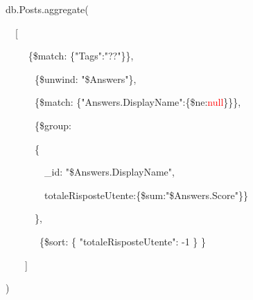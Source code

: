 \textcolor{mydark}{db.Posts.aggregate(}
    \par
    ~~\textcolor{mydark}{[}\par
    ~~~~ \textcolor{mydark}{\{}\textcolor{mybrown}{\$match}: \textcolor{mydark}{\{}\textcolor{mygreen}{"Tags":"??"}\textcolor{mydark}{\}}\textcolor{mydark}{\}},\par
    ~~~~~~\textcolor{mydark}{\{}\textcolor{mybrown}{\$unwind}: \textcolor{mygreen}{"\$Answers"}\textcolor{mydark}{\}},\par
    ~~~~~~\textcolor{mydark}{\{}\textcolor{mybrown}{\$match}: \textcolor{mydark}{\{}\textcolor{mygreen}{"Answers.DisplayName"}:\textcolor{mydark}{\{}\textcolor{mybrown}{\$ne}:\textcolor{red}{null}\textcolor{mydark}{\}}\textcolor{mydark}{\}}\textcolor{mydark}{\}},\par
    ~~~~~~\textcolor{mydark}{\{}\textcolor{mybrown}{\$group}: \par
    ~~~~~~\textcolor{mydark}{\{}\par
    ~~~~~~~~\textcolor{mydark}{\_id:} \textcolor{mygreen}{"\$Answers.DisplayName"},\par
    ~~~~~~~~\textcolor{mydark}{totaleRisposteUtente:\{}\textcolor{mybrown}{\$sum}:\textcolor{mygreen}{"\$Answers.Score"}\textcolor{mydark}{\}}\textcolor{mydark}{\}}\par
    ~~~~~~\textcolor{mydark}{\},}\par
    ~~~~~~~\textcolor{mydark}{\{}\textcolor{mybrown}{\$sort}: \textcolor{mydark}{\{}\textcolor{mygreen}{ "totaleRisposteUtente"}: -1 \textcolor{mydark}{\}} \textcolor{mydark}{\}}\par
    ~~~~\textcolor{mydark}{]}\par
\textcolor{mydark}{)}